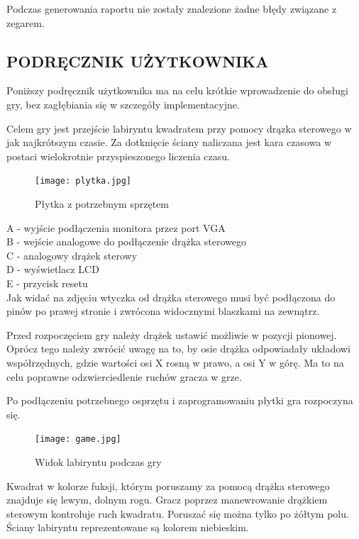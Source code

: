 \documentclass[11pt]{article}
\begin{document}
Podczas generowania raportu nie zostały znalezione żadne błędy związane z zegarem.


\subsection{PODRĘCZNIK UŻYTKOWNIKA}

Poniższy podręcznik użytkownika ma na celu krótkie wprowadzenie do obsługi gry, bez zagłębiania się w szczegóły implementacyjne.

Celem gry jest przejście labiryntu kwadratem przy pomocy drązka sterowego w jak najkrótszym czasie. Za dotknięcie ściany naliczana jest kara czasowa w postaci wielokrotnie przyspieszonego liczenia czasu.

\begin{figure}[H]
\centering
\texttt{[image: plytka.jpg]}
\caption{Płytka z potrzebnym sprzętem}
\end{figure}

A - wyjście podłączenia monitora przez port VGA \\
B - wejście analogowe do podłączenie drążka sterowego \\
C - analogowy drążek sterowy \\
D - wyświetlacz LCD \\
E - przycisk resetu \\

Jak widać na zdjęciu wtyczka od drążka sterowego musi być podłączona do pinów po prawej stronie i zwrócona widocznymi blaszkami na zewnątrz.

Przed rozpoczęciem gry należy drążek ustawić możliwie w pozycji pionowej.
Oprócz tego należy zwrócić uwagę na to, by osie drążka odpowiadały układowi współrzędnych, gdzie wartości osi X rosną w prawo, a osi Y w górę.
Ma to na celu poprawne odzwierciedlenie ruchów gracza w grze. 
%

Po podłączeniu potrzebnego osprzętu i zaprogramowaniu płytki gra rozpoczyna się. 

\begin{figure}[H]
\centering
\texttt{[image: game.jpg]}
\caption{Widok labiryntu podczas gry}
\end{figure}

Kwadrat w kolorze fuksji, którym poruszamy za pomocą drążka sterowego znajduje się lewym, dolnym rogu.
Gracz poprzez manewrowanie drążkiem sterowym kontroluje ruch kwadratu.
Poruszać się można tylko po żółtym polu. Ściany labiryntu reprezentowane są kolorem niebieskim.
\end{document}
